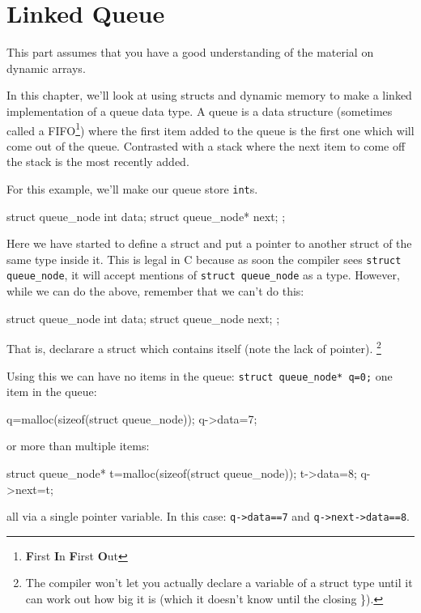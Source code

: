 
\chapter{Linked Queue}

\begin{knowledge}
This part assumes that you have a good understanding of the material on dynamic arrays. 
\end{knowledge}

In this chapter, we'll look at using structs and dynamic memory to make a linked implementation of a queue data type.
A queue is a data structure (sometimes called a FIFO\footnote{\textbf{F}irst \textbf{I}n \textbf{F}irst \textbf{O}ut}) 
where the first item added to the queue is the first one which will come out of the queue.
Contrasted with a stack where the next item to come off the stack is the most recently added.

For this example, we'll make our queue store \texttt{int}s.

\begin{codeinline}
struct queue_node {
    int data;
    struct queue_node* next;
};
\end{codeinline}

Here we have started to define a struct and put a pointer to another struct of the same type inside it.
This is legal in C because as soon the compiler sees \texttt{struct queue\_node}, it will accept mentions of \texttt{struct queue\_node}
as a type. However, while we can do the above, remember that we can't do this:

\begin{codeinline}
struct queue_node {
    int data;
    struct queue_node next;
};
\end{codeinline}
That is, declarare a struct which contains itself (note the lack of pointer).
\footnote{The compiler won't let you actually declare a variable of a 
struct type until it can work out how big it is (which it doesn't know until the closing \}).}



Using this we can have no items in the queue:
\lstinline!struct queue_node* q=0;!
one item in the queue:
\begin{codeinline}
q=malloc(sizeof(struct queue_node));
q->data=7;
\end{codeinline}
or more than multiple items:
\begin{codeinline}
struct queue_node* t=malloc(sizeof(struct queue_node));
t->data=8;
q->next=t;
\end{codeinline}
all via a single pointer variable.
In this case: \lstinline!q->data==7! and \lstinline!q->next->data==8!.

